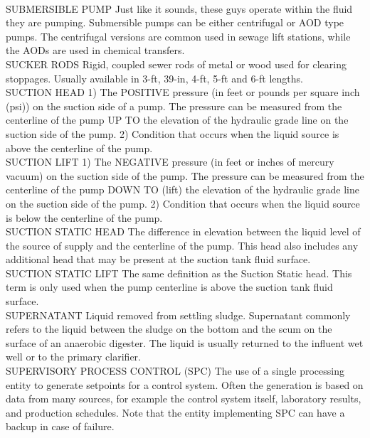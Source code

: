 \vspace{0.3cm}\\
SUBMERSIBLE PUMP
Just like it sounds, these guys operate within the fluid they are pumping. Submersible pumps can be either centrifugal or AOD type pumps. The centrifugal versions are common used in sewage lift stations, while the AODs are used in chemical transfers.
\vspace{0.3cm}\\
SUCKER RODS
Rigid, coupled sewer rods of metal or wood used for clearing stoppages. Usually available in 3-ft, 39-in, 4-ft, 5-ft and 6-ft lengths. 
\vspace{0.3cm}\\
SUCTION HEAD
1) The POSITIVE pressure (in feet or pounds per square inch (psi)) on the suction side of a pump. The pressure can be measured from the centerline of the pump UP TO the elevation of the hydraulic grade line on the suction side of the pump. 2)  Condition that occurs when the liquid source is above the centerline of the pump.
\vspace{0.3cm}\\
SUCTION LIFT
1) The NEGATIVE pressure (in feet or inches of mercury vacuum) on the suction side of the pump. The pressure can be measured from the centerline of the pump DOWN TO (lift) the elevation of the hydraulic grade line on the suction side of the pump. 2) Condition that occurs when the liquid source is below the centerline of the pump.
\vspace{0.3cm}\\
SUCTION STATIC HEAD
The difference in elevation between the liquid level of the source of supply and the centerline of the pump. This head also includes any additional head that may be present at the suction tank fluid surface.
\vspace{0.3cm}\\
SUCTION STATIC LIFT
The same definition as the Suction Static head. This term is only used when the pump centerline is above the suction tank fluid surface.
\vspace{0.3cm}\\
SUPERNATANT
Liquid removed from settling sludge. Supernatant commonly refers to the liquid between the sludge on the bottom and the scum on the surface of an anaerobic digester. The liquid is usually returned to the influent wet well or to the primary clarifier.
\vspace{0.3cm}\\
SUPERVISORY PROCESS CONTROL (SPC)
The use of a single processing entity to generate setpoints for a control system. Often the generation is based on data from many sources, for example the control system itself, laboratory results, and production schedules. Note that the entity implementing SPC can have a backup in case of failure.
\vspace{0.3cm}\\

